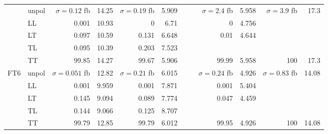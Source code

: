 \begin{table}[h]
{\begin{tabular}{llrrrrrrrrrr}
 & unpol & $\sigma = \num{0.12}$ fb & \num{14.25} & $\sigma = \num{0.19}$ fb & \num{5.909} &  &  & $\sigma = \num{2.4}$ fb & \num{5.958} & $\sigma = \num{3.9}$ fb & \num{17.3} \\
 & LL & \num{0.001} & \num{10.93} & \num{0} & \num{6.71} &  &  & \num{0} & \num{4.756} &  &  \\
 & LT & \num{0.097} & \num{10.59} & \num{0.131} & \num{6.648} &  &  & \num{0.01} & \num{4.644} &  &  \\
 & TL & \num{0.095} & \num{10.39} & \num{0.203} & \num{7.523} &  &  &  &  &  &  \\
 & TT & \num{99.85} & \num{14.27} & \num{99.67} & \num{5.906} &  &  & \num{99.99} & \num{5.958} & \num{100} & \num{17.3} \\
\midrule
\multirow{5}{*}{FT6}
 & unpol & $\sigma = \num{0.051}$ fb & \num{12.82} & $\sigma = \num{0.21}$ fb & \num{6.015} &  &  & $\sigma = \num{0.24}$ fb & \num{4.926} & $\sigma = \num{0.83}$ fb & \num{14.08} \\
 & LL & \num{0.001} & \num{9.959} & \num{0.001} & \num{7.871} &  &  & \num{0.001} & \num{5.404} &  &  \\
 & LT & \num{0.145} & \num{9.094} & \num{0.089} & \num{7.774} &  &  & \num{0.047} & \num{4.459} &  &  \\
 & TL & \num{0.144} & \num{9.066} & \num{0.125} & \num{8.707} &  &  &  &  &  &  \\
 & TT & \num{99.79} & \num{12.85} & \num{99.79} & \num{6.012} &  &  & \num{99.95} & \num{4.926} & \num{100} & \num{14.08} \\
\bottomrule
\end{tabular}
}%
\end{table}
\newpage

